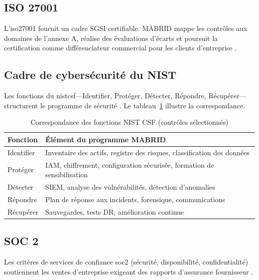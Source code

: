 \subsection{ISO 27001}

L'\gls{iso27001} fournit un cadre SGSI certifiable. MABRID mappe les contrôles aux domaines de l'annexe A, réalise des évaluations d'écarts et poursuit la certification comme différenciateur commercial pour les clients d'entreprise \parencite{iso27001standard}.

\subsection{Cadre de cybersécurité du NIST}

Les fonctions du \gls{nistcsf}---Identifier, Protéger, Détecter, Répondre, Récupérer---structurent le programme de sécurité \parencite{nistcsf20}. Le tableau~\ref{tab:nist-mapping} illustre la correspondance.

\begin{table}[H]
  \centering
  \caption{Correspondance des fonctions NIST CSF (contrôles sélectionnés)}
  \label{tab:nist-mapping}
  \begin{tabularx}{\textwidth}{@{}lX@{}}
    \toprule
    \textbf{Fonction} & \textbf{Élément du programme MABRID} \\
    \midrule
    Identifier & Inventaire des actifs, registre des risques, classification des données \\
    Protéger & IAM, chiffrement, configuration sécurisée, formation de sensibilisation \\
    Détecter & SIEM, analyse des vulnérabilités, détection d'anomalies \\
    Répondre & Plan de réponse aux incidents, forensique, communications \\
    Récupérer & Sauvegardes, tests DR, amélioration continue \\
    \bottomrule
  \end{tabularx}
\end{table}

\subsection{SOC 2}

Les critères de services de confiance \gls{soc2} (sécurité, disponibilité, confidentialité) soutiennent les ventes d'entreprise exigeant des rapports d'assurance fournisseur \parencite{aicpaSOC2}.

